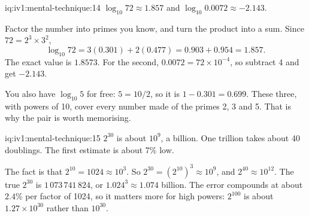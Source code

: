 \begin{solution}{iq:iv1:mental-technique:14}
$\log_{10} 72 \approx 1.857$ and $\log_{10} 0.0072 \approx -2.143$.

Factor the number into primes you know, and turn the product into a sum. Since $72 = 2^3 \times 3^2$,
\[
\log_{10} 72 = 3(0.301) + 2(0.477) = 0.903 + 0.954 = 1.857.
\]
The exact value is $1.8573$. For the second, $0.0072 = 72 \times 10^{-4}$, so subtract 4 and get $-2.143$.

You also have $\log_{10} 5$ for free: $5 = 10/2$, so it is $1 - 0.301 = 0.699$. These three, with powers of 10, cover every number made of the primes 2, 3 and 5. That is why the pair is worth memorising.

\end{solution}

\begin{solution}{iq:iv1:mental-technique:15}
$2^{30}$ is about $10^9$, a billion. One trillion takes about 40 doublings. The first estimate is about 7\% low.

The fact is that $2^{10} = 1024 \approx 10^3$. So $2^{30} = (2^{10})^3 \approx 10^9$, and $2^{40} \approx 10^{12}$. The true $2^{30}$ is $1\,073\,741\,824$, or $1.024^3 \approx 1.074$ billion. The error compounds at about $2.4\%$ per factor of 1024, so it matters more for high powers: $2^{100}$ is about $1.27 \times 10^{30}$ rather than $10^{30}$.

\end{solution}

